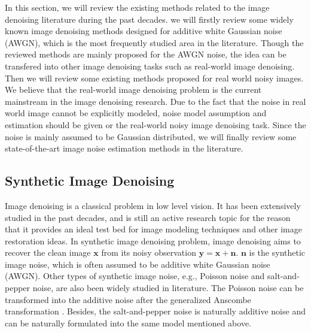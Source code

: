In this section, we will review the existing methods related to the image denoising literature during the past decades. we will firstly review some widely known image denoising methods designed for additive white Gaussian noise (AWGN), which is the most frequently studied area in the literature. Though the reviewed methods are mainly proposed for the AWGN noise, the idea can be transfered into other image denoising tasks such as real-world image denoising. Then we will review some existing methods proposed for real world noisy images. We believe that the real-world image denoising problem is the current mainstream in the image denoising research. Due to the fact that the noise in real world image cannot be explicitly modeled, noise model assumption and estimation should be given or the real-world noisy image denoising task. Since the noise is mainly assumed to be Gaussian distributed, we will finally review some state-of-the-art image noise estimation methods in the literature.

\subsection{Synthetic Image Denoising}
\label{sec:review:sys}

Image denoising is a classical problem in low level vision. It has been extensively studied in the past decades, and is still an active research topic for the reason that it provides an ideal test bed for image modeling techniques and other image restoration ideas. In synthetic image denoising problem, image denoising aims to recover the clean image $\mathbf{x}$ from its noisy observation $\mathbf{y} = \mathbf{x} + \mathbf{n}$. $\mathbf{n}$ is the synthetic image noise, which is often assumed to be additive white Gaussian noise (AWGN). Other types of synthetic image noise, e.g., Poisson noise and salt-and-pepper noise, are also been widely studied in literature. The Poisson noise can be transformed into the additive noise after the generalized Anscombe transformation \cite{makitalo2013optimal}. Besides, the salt-and-pepper noise is naturally additive noise and can be naturally formulated into the same model mentioned above.

